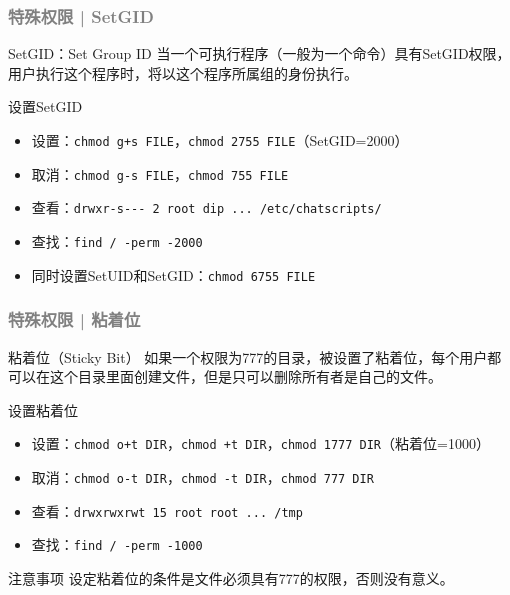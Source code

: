 \begin{frame}[fragile]
  \frametitle{\textcolor{gray}{特殊权限 | SetGID}}
  \begin{block}{SetGID：Set Group ID}
    当一个可执行程序（一般为一个命令）具有SetGID权限，用户执行这个程序时，将以这个程序所属组的身份执行。
  \end{block}
  \pause
  \begin{block}{设置SetGID}
    \begin{itemize}
      \item 设置：\verb|chmod g+s FILE|，\verb|chmod 2755 FILE|（SetGID=2000）
      \item 取消：\verb|chmod g-s FILE|，\verb|chmod 755 FILE|
      \item 查看：\verb|drwxr-s--- 2 root dip ... /etc/chatscripts/|
      \item 查找：\verb|find / -perm -2000|
      \item 同时设置SetUID和SetGID：\verb|chmod 6755 FILE|
    \end{itemize}
  \end{block}
\end{frame}

\begin{frame}[fragile]
  \frametitle{\textcolor{gray}{特殊权限 | 粘着位}}
  \begin{block}{粘着位（Sticky Bit）}
    如果一个权限为777的目录，被设置了粘着位，每个用户都可以在这个目录里面创建文件，但是只可以删除所有者是自己的文件。
  \end{block}
  \pause
  \begin{block}{设置粘着位}
    \begin{itemize}
      \item 设置：\verb|chmod o+t DIR|，\verb|chmod +t DIR|，\verb|chmod 1777 DIR|（粘着位=1000）
      \item 取消：\verb|chmod o-t DIR|，\verb|chmod -t DIR|，\verb|chmod 777 DIR|
      \item 查看：\verb|drwxrwxrwt 15 root root ... /tmp|
      \item 查找：\verb|find / -perm -1000|
    \end{itemize}
  \end{block}
  \pause
  \begin{block}{注意事项}
    设定粘着位的条件是文件必须具有777的权限，否则没有意义。
  \end{block}
\end{frame}


